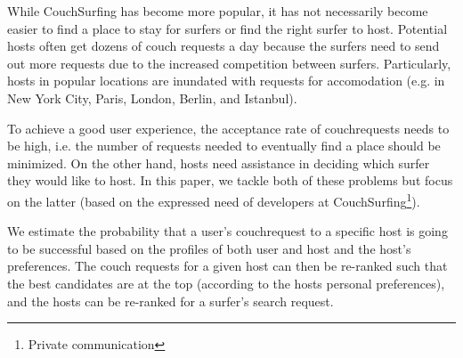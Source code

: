 While CouchSurfing has become more popular, it has not necessarily become easier to find a place to stay for surfers or find the right surfer to host. Potential hosts often get dozens of couch requests a day because the surfers need to send out more requests due to the increased competition between surfers. Particularly, hosts in popular locations are inundated with requests for accomodation (e.g. in New York City, Paris, London, Berlin, and Istanbul).

To achieve a good user experience, the acceptance rate of couchrequests needs to be high, i.e. the number of requests needed to eventually find a place should be minimized. On the other hand, hosts need assistance in deciding which surfer they would like to host. In this paper, we tackle both of these problems but focus on the latter (based on the expressed need of developers at CouchSurfing\footnote{Private communication}).

We estimate the probability that a user's couchrequest to a specific host is going to be successful based on the profiles of both user and host and the host's preferences. The couch requests for a given host can then be re-ranked such that the best candidates are at the top (according to the hosts personal preferences), and the hosts can be re-ranked for a surfer's search request.
